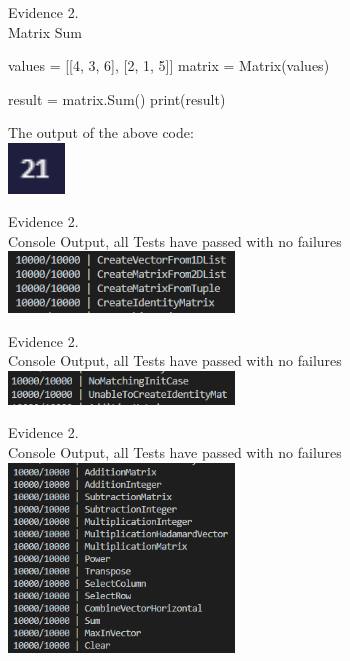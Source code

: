 \begin{center}
    {\large Evidence 2.\rn } \\ 
    \vspace{0.3cm}
    Matrix Sum \\
    \begin{pythoncode}
values = [[4, 3, 6],
        [2, 1, 5]]
matrix = Matrix(values)

result = matrix.Sum()
print(result)
    \end{pythoncode}
    The output of the above code: \\
    \includegraphics[width=1.5cm]{Images/Testing/T2.19.1.PNG} \\
    \vspace{1cm}
    
    {\large Evidence 2.\rn } \\ 
    \vspace{0.3cm}
    Console Output, all Tests have passed with no failures \\
    \includegraphics[width=6cm]{Images/Testing/T2.20.1.PNG} \\
    \vspace{1cm}

    {\large Evidence 2.\rn } \\ 
    \vspace{0.3cm}
    Console Output, all Tests have passed with no failures \\
    \includegraphics[width=6cm]{Images/Testing/T2.21.1.PNG} \\
    \vspace{1cm}

    {\large Evidence 2.\rn } \\ 
    \vspace{0.3cm}
    Console Output, all Tests have passed with no failures \\
    \includegraphics[width=6cm]{Images/Testing/T2.22.1.PNG} \\
    \vspace{1cm}


\end{center}
